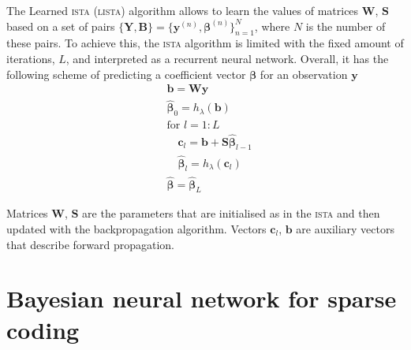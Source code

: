 \documentclass{article}
\begin{document}
The Learned \textsc{ista} (\textsc{lista}) \citep{gregor2010learning} algorithm allows to learn the values of matrices $\mathbf{W}$, $\mathbf{S}$ based on a set of pairs $\{\mathbf{Y}, \mathbf{B}\}=\{\mathbf{y}^{(n)}, \boldsymbol\beta^{(n)}\}_{n=1}^N$, where $N$ is the number of these pairs. To achieve this, the \textsc{ista} algorithm is limited with the fixed amount of iterations, $L$, and interpreted as a recurrent neural network. Overall, it has the following scheme of predicting a coefficient vector $\boldsymbol\beta$ for an observation $\mathbf{y}$
\begin{align}
\label{eq:first_layer}
&\mathbf{b} = \mathbf{W}\mathbf{y}\\
\label{eq:thr_first}
&\widehat{\boldsymbol\beta}_0 = h_\lambda(\mathbf{b}) \\
&\text{for } l=1:L\\
\label{eq:l_dense_layer}
	&\quad \mathbf{c}_l = \mathbf{b} + \mathbf{S}\widehat{\boldsymbol\beta}_{l-1} \\
\label{eq:l_thr}
	&\quad \widehat{\boldsymbol\beta}_{l} = h_\lambda(\mathbf{c}_l) \\
& \widehat{\boldsymbol\beta} = \widehat{\boldsymbol\beta}_{L}
\end{align}

Matrices $\mathbf{W}$, $\mathbf{S}$ are the parameters that are initialised as in the \textsc{ista} and then updated with the backpropagation algorithm. Vectors $\mathbf{c}_l$, $\mathbf{b}$ are auxiliary vectors that describe forward propagation.

\section{Bayesian neural network for sparse coding}
\label{sec:bayesian_lista}
\end{document}
